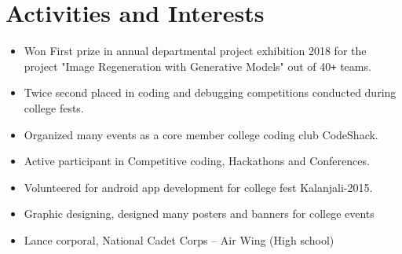 \documentclass[10pt]{article}
\begin{document}
\section{Activities and Interests}
\begin{itemize}
 \itemsep0em
 \item 
 Won First prize in annual departmental project exhibition 2018 for the project "Image Regeneration with Generative Models" out of 40\texttt{+} teams.
 \item 
 Twice second placed in coding and debugging competitions conducted during college fests.
 \item
 Organized many events as a core member college coding club CodeShack.
 \item
 Active participant in Competitive coding, Hackathons and Conferences.
 \item
 Volunteered for android app development for college fest Kalanjali-2015.
 \item
 Graphic designing, designed many posters and banners for college events
 \item
 Lance corporal, National Cadet Corps – Air Wing (High school)

\end{itemize}
\end{document}
